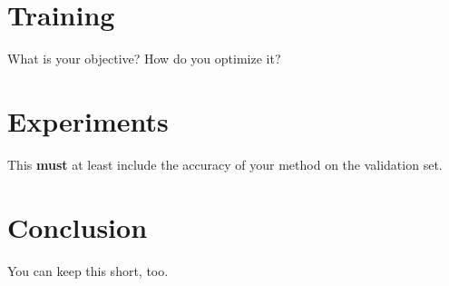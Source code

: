 \documentclass{article}
\begin{document}

\section{Training}
What is your objective? How do you optimize it?

\section{Experiments}
This {\bf must} at least include the accuracy of your method on the validation set.
\section{Conclusion}
You can keep this short, too. \cite{*}



\end{document}
